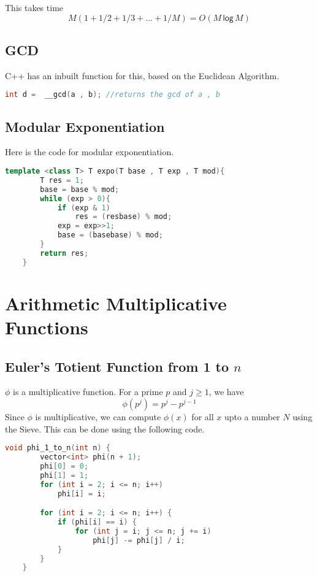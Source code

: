 \documentclass[12pt,a4paper]{amsart}
\numberwithin{equation}{section}
\theoremstyle{definition}
\begin{document}
This takes time 
$$M(1 + 1/2 + 1/3 + ... + 1/M) = O(M\mathsf{\,log\,}M)$$

\subsection{GCD} C++ has an inbuilt function for this, based on the Euclidean Algorithm.
\begin{lstlisting}[language=C++]
    int d =  __gcd(a , b); //returns the gcd of a , b
\end{lstlisting}

\subsection{Modular Exponentiation} Here is the code for modular exponentiation. 
\begin{lstlisting}[language=C++]
    template <class T> T expo(T base , T exp , T mod){
        T res = 1;
        base = base % mod;
        while (exp > 0){
            if (exp & 1)
                res = (resbase) % mod;
            exp = exp>>1;
            base = (basebase) % mod;
        }
        return res;
    }
\end{lstlisting}

\section{Arithmetic Multiplicative Functions}

\subsection{Euler's Totient Function from 1 to $n$} $\phi$ is a multiplicative function. For a prime $p$ and $j\ge 1$, we have 
$$\phi(p^j) = p^j - p^{j - 1}$$
Since $\phi$ is multiplicative, we can compute $\phi(x)$ for all $x$ upto a number $N$ using the Sieve. This can be done using the following code. 

\begin{lstlisting}[language=C++]
    void phi_1_to_n(int n) {
        vector<int> phi(n + 1);
        phi[0] = 0;
        phi[1] = 1;
        for (int i = 2; i <= n; i++)
            phi[i] = i;

        for (int i = 2; i <= n; i++) {
            if (phi[i] == i) {
                for (int j = i; j <= n; j += i)
                    phi[j] -= phi[j] / i;
            }
        }
    }
\end{lstlisting}
\end{document}
